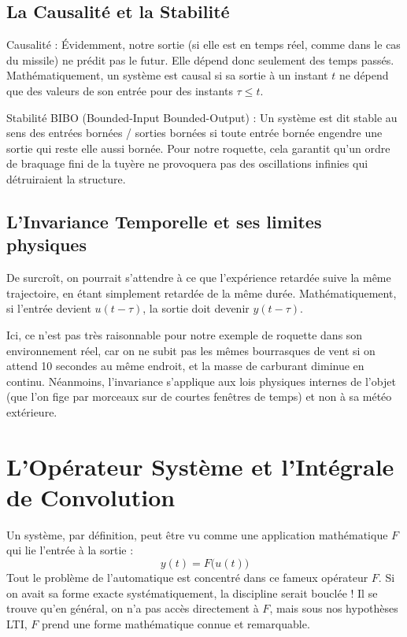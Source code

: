 \documentclass[11pt,a4paper]{report}
\begin{document}
\subsection{La Causalité et la Stabilité}
\begin{itemize}
    \begin{defbox}{Causalité :} Évidemment, notre sortie (si elle est en temps réel, comme dans le cas du missile) ne prédit pas le futur. Elle dépend donc seulement des temps passés. Mathématiquement, un système est causal si sa sortie à un instant $t$ ne dépend que des valeurs de son entrée pour des instants $\tau \le t$.
    \end{defbox}
    \begin{defbox}{Stabilité BIBO (Bounded-Input Bounded-Output) :} Un système est dit stable au sens des entrées bornées / sorties bornées si toute entrée bornée engendre une sortie qui reste elle aussi bornée. Pour notre roquette, cela garantit qu'un ordre de braquage fini de la tuyère ne provoquera pas des oscillations infinies qui détruiraient la structure.
    \end{defbox}    
    \end{itemize}


\subsection{L'Invariance Temporelle et ses limites physiques}
De surcroît, on pourrait s'attendre à ce que l'expérience retardée suive la même trajectoire, en étant simplement retardée de la même durée. Mathématiquement, si l'entrée devient $u(t - \tau)$, la sortie doit devenir $y(t - \tau)$.

Ici, ce n'est pas très raisonnable pour notre exemple de roquette dans son environnement réel, car on ne subit pas les mêmes bourrasques de vent si on attend 10 secondes au même endroit, et la masse de carburant diminue en continu. Néanmoins, l'invariance s'applique aux lois physiques internes de l'objet (que l'on fige par morceaux sur de courtes fenêtres de temps) et non à sa météo extérieure.

\section{L'Opérateur Système et l'Intégrale de Convolution}

Un système, par définition, peut être vu comme une application mathématique $F$ qui lie l'entrée à la sortie : 
\[ y(t) = F\big(u(t)\big) \]
Tout le problème de l'automatique est concentré dans ce fameux opérateur $F$. Si on avait sa forme exacte systématiquement, la discipline serait bouclée ! Il se trouve qu'en général, on n'a pas accès directement à $F$, mais sous nos hypothèses LTI, $F$ prend une forme mathématique connue et remarquable.
\end{document}
